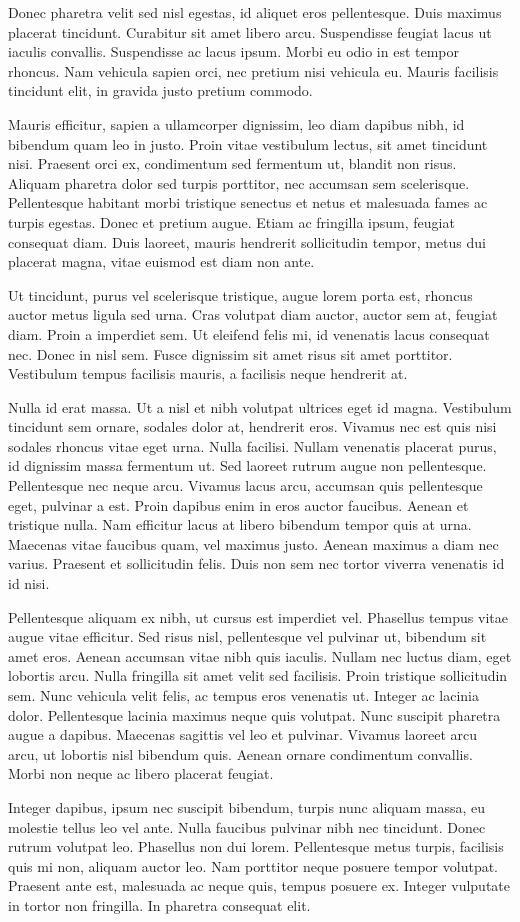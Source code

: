 Donec pharetra velit sed nisl egestas, id aliquet eros pellentesque. Duis maximus placerat tincidunt. Curabitur sit amet libero arcu. Suspendisse feugiat lacus ut iaculis convallis. Suspendisse ac lacus ipsum. Morbi eu odio in est tempor rhoncus. Nam vehicula sapien orci, nec pretium nisi vehicula eu. Mauris facilisis tincidunt elit, in gravida justo pretium commodo.

Mauris efficitur, sapien a ullamcorper dignissim, leo diam dapibus nibh, id bibendum quam leo in justo. Proin vitae vestibulum lectus, sit amet tincidunt nisi. Praesent orci ex, condimentum sed fermentum ut, blandit non risus. Aliquam pharetra dolor sed turpis porttitor, nec accumsan sem scelerisque. Pellentesque habitant morbi tristique senectus et netus et malesuada fames ac turpis egestas. Donec et pretium augue. Etiam ac fringilla ipsum, feugiat consequat diam. Duis laoreet, mauris hendrerit sollicitudin tempor, metus dui placerat magna, vitae euismod est diam non ante.

Ut tincidunt, purus vel scelerisque tristique, augue lorem porta est, rhoncus auctor metus ligula sed urna. Cras volutpat diam auctor, auctor sem at, feugiat diam. Proin a imperdiet sem. Ut eleifend felis mi, id venenatis lacus consequat nec. Donec in nisl sem. Fusce dignissim sit amet risus sit amet porttitor. Vestibulum tempus facilisis mauris, a facilisis neque hendrerit at.

Nulla id erat massa. Ut a nisl et nibh volutpat ultrices eget id magna. Vestibulum tincidunt sem ornare, sodales dolor at, hendrerit eros. Vivamus nec est quis nisi sodales rhoncus vitae eget urna. Nulla facilisi. Nullam venenatis placerat purus, id dignissim massa fermentum ut. Sed laoreet rutrum augue non pellentesque. Pellentesque nec neque arcu. Vivamus lacus arcu, accumsan quis pellentesque eget, pulvinar a est. Proin dapibus enim in eros auctor faucibus. Aenean et tristique nulla. Nam efficitur lacus at libero bibendum tempor quis at urna. Maecenas vitae faucibus quam, vel maximus justo. Aenean maximus a diam nec varius. Praesent et sollicitudin felis. Duis non sem nec tortor viverra venenatis id id nisi.

Pellentesque aliquam ex nibh, ut cursus est imperdiet vel. Phasellus tempus vitae augue vitae efficitur. Sed risus nisl, pellentesque vel pulvinar ut, bibendum sit amet eros. Aenean accumsan vitae nibh quis iaculis. Nullam nec luctus diam, eget lobortis arcu. Nulla fringilla sit amet velit sed facilisis. Proin tristique sollicitudin sem. Nunc vehicula velit felis, ac tempus eros venenatis ut. Integer ac lacinia dolor. Pellentesque lacinia maximus neque quis volutpat. Nunc suscipit pharetra augue a dapibus. Maecenas sagittis vel leo et pulvinar. Vivamus laoreet arcu arcu, ut lobortis nisl bibendum quis. Aenean ornare condimentum convallis. Morbi non neque ac libero placerat feugiat.

Integer dapibus, ipsum nec suscipit bibendum, turpis nunc aliquam massa, eu molestie tellus leo vel ante. Nulla faucibus pulvinar nibh nec tincidunt. Donec rutrum volutpat leo. Phasellus non dui lorem. Pellentesque metus turpis, facilisis quis mi non, aliquam auctor leo. Nam porttitor neque posuere tempor volutpat. Praesent ante est, malesuada ac neque quis, tempus posuere ex. Integer vulputate in tortor non fringilla. In pharetra consequat elit.
